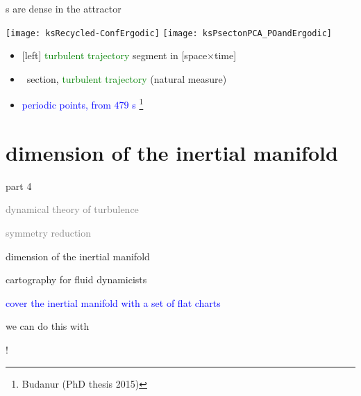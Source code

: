 \begin{frame}{\po s are dense in the attractor}
\begin{center}
\texttt{[image: ksRecycled-ConfErgodic]}
\texttt{[image: ksPsectonPCA\_POandErgodic]}
\end{center}
\begin{itemize}
  \item {[left]} \textcolor{green}{turbulent trajectory} segment in [space$\times$time]
  \item \Poincare\ section, \textcolor{green}{turbulent trajectory} (natural measure)
  \item \textcolor{blue}{periodic points, from $479$ \po s}%
\footnote{\footnotesize
Budanur (PhD thesis 2015)}
\end{itemize}

\end{frame}

\section[dimension of the inertial manifold]
{dimension of the inertial manifold}

\begin{frame}{part 4}
\begin{enumerate}
              \item
    \textcolor{gray}{\small
dynamical theory of turbulence
              \item
\statesp
              \item
symmetry reduction
    }
              \item
    {\Large
dimension of the inertial manifold
                    }
            \end{enumerate}
\end{frame}


\begin{frame}{cartography for fluid dynamicists}
\bigskip

\textcolor{blue}{cover the inertial manifold with a set of flat charts}

\hfill
\vfill
we can do this with

\hfill \color{red}{finite\dmn\ bricks embedded in $10^2$ dimensions}!
\end{frame}

